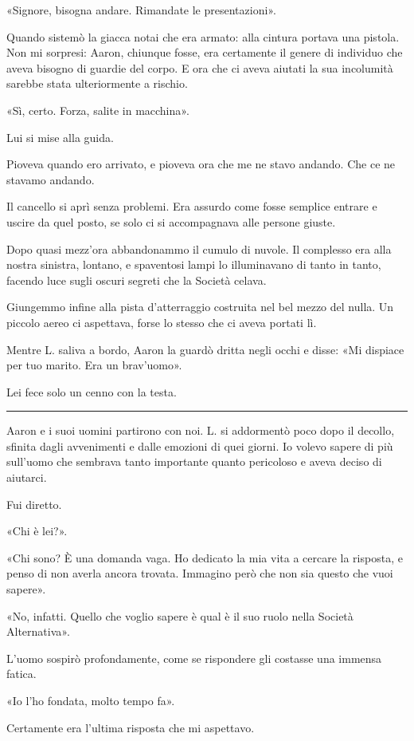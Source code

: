 \documentclass[a4paper,11pt,oneside,openright,final]{memoir}
\begin{document}
«Signore, bisogna andare. Rimandate le presentazioni».

Quando sistemò la giacca notai che era armato: alla cintura portava una pistola.
Non mi sorpresi: Aaron, chiunque fosse, era certamente il genere di individuo
che aveva bisogno di guardie del corpo. E ora che ci aveva aiutati la sua
incolumità sarebbe stata ulteriormente a rischio.

«Sì, certo. Forza, salite in macchina».

Lui si mise alla guida.

Pioveva quando ero arrivato, e pioveva ora che me ne stavo andando. Che ce ne
stavamo andando.

Il cancello si aprì senza problemi. Era assurdo come fosse semplice entrare e
uscire da quel posto, se solo ci si accompagnava alle persone giuste.

Dopo quasi mezz'ora abbandonammo il cumulo di nuvole. Il complesso era alla
nostra sinistra, lontano, e spaventosi lampi lo illuminavano di tanto in tanto,
facendo luce sugli oscuri segreti che la Società celava.

Giungemmo infine alla pista d'atterraggio costruita nel bel mezzo del nulla.
Un piccolo aereo ci aspettava, forse lo stesso che ci aveva portati lì.

Mentre L. saliva a bordo, Aaron la guardò dritta negli occhi e disse: «Mi
dispiace per tuo marito. Era un brav'uomo».

Lei fece solo un cenno con la testa.

\plainbreak{1}

Aaron e i suoi uomini partirono con noi. L. si addormentò poco dopo il decollo,
sfinita dagli avvenimenti e dalle emozioni di quei giorni. Io volevo sapere di
più sull'uomo che sembrava tanto importante quanto pericoloso e aveva deciso di
aiutarci.

Fui diretto.

«Chi è lei?».

«Chi sono? È una domanda vaga. Ho dedicato la mia vita a cercare la risposta,
e penso di non averla ancora trovata. Immagino però che non sia questo che vuoi
sapere».

«No, infatti. Quello che voglio sapere è qual è il suo ruolo nella Società
Alternativa».

L'uomo sospirò profondamente, come se rispondere gli costasse una immensa
fatica.

«Io l'ho fondata, molto tempo fa».

Certamente era l'ultima risposta che mi aspettavo.
\end{document}
